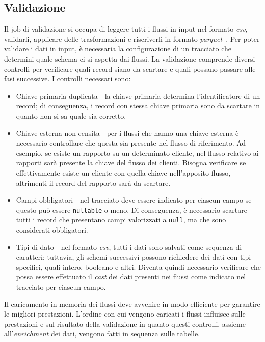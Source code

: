 \subsection{Validazione}\label{subsec:etl-validation}
Il job di validazione si occupa di leggere tutti i flussi in input nel formato \textit{csv}, validarli, applicare delle trasformazioni e riscriverli in formato \textit{parquet}~\cite{parquet}.
Per poter validare i dati in input, è necessaria la configurazione di un tracciato che determini quale schema ci si aspetta dai flussi.
La validazione comprende diversi controlli per verificare quali record siano da scartare e quali possano passare alle fasi successive.
I controlli necessari sono:
\begin{itemize}
    \item Chiave primaria duplicata - la chiave primaria determina l'identificatore di un record;
    di conseguenza, i record con stessa chiave primaria sono da scartare in quanto non si sa quale sia corretto.
    \item Chiave esterna non censita - per i flussi che hanno una chiave esterna è necessario controllare che questa sia presente nel flusso di riferimento.
    Ad esempio, se esiste un rapporto su un determinato cliente, nel flusso relativo ai rapporti sarà presente la chiave del flusso dei clienti.
    Bisogna verificare se effettivamente esiste un cliente con quella chiave nell'apposito flusso, altrimenti il record del rapporto sarà da scartare.
    \item Campi obbligatori - nel tracciato deve essere indicato per ciascun campo se questo può essere \texttt{nullable} o meno.
    Di conseguenza, è necessario scartare tutti i record che presentano campi valorizzati a \texttt{null}, ma che sono considerati obbligatori.
    \item Tipi di dato - nel formato \textit{csv}, tutti i dati sono salvati come sequenza di caratteri;
    tuttavia, gli schemi successivi possono richiedere dei dati con tipi specifici, quali intero, booleano e altri.
    Diventa quindi necessario verificare che possa essere effettuato il \textit{cast} dei dati presenti nei flussi come indicato nel tracciato per ciascun campo.
\end{itemize}
Il caricamento in memoria dei flussi deve avvenire in modo efficiente per garantire le migliori prestazioni.
L'ordine con cui vengono caricati i flussi influisce sulle prestazioni e sul risultato della validazione in quanto questi controlli, assieme all'\textit{enrichment} dei dati, vengono fatti in sequenza sulle tabelle.
